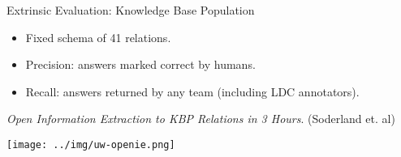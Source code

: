 \def\title{Extrinsic Evaluation: Knowledge Base Population}

\begin{frame}[noframenumbering]{\title}
\begin{itemize}
  \item Fixed schema of 41 relations.
  \item Precision: answers marked correct by humans.
  \item Recall: answers returned by any team (including LDC annotators).
\end{itemize}
\pause
\vspace{1em}

 \textit{Open Information Extraction to KBP Relations in 3 Hours}.
  (Soderland et. al)

\begin{center}
\texttt{[image: ../img/uw-openie.png]} \\
\end{center}
\end{frame}

